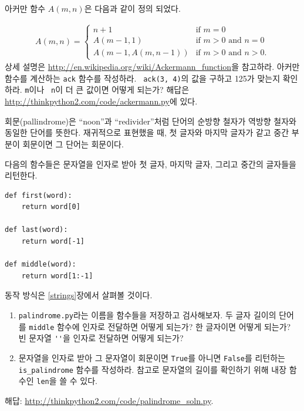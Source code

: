\documentclass[10pt]{book}
\begin{document}
\begin{exercise}
\label{ackermann}

아커만 함수 $A(m, n)$은 다음과 같이 정의 되었다. 

\begin{eqnarray*}
A(m, n) = \begin{cases} 
              n+1 & \mbox{if } m = 0 \\ 
        A(m-1, 1) & \mbox{if } m > 0 \mbox{ and } n = 0 \\ 
A(m-1, A(m, n-1)) & \mbox{if } m > 0 \mbox{ and } n > 0.
\end{cases} 
\end{eqnarray*}
%
상세 설명은 \url{http://en.wikipedia.org/wiki/Ackermann_function}을
참고하라.  아커만 함수를 계산하는 {\tt ack} 함수를 작성하라.  {\tt
  ack(3, 4)}의 값을 구하고 125가 맞는지 확인하라.  {\tt m}이나 {\tt
  n}이 더 큰 값이면 어떻게 되는가? 해답은
\url{http://thinkpython2.com/code/ackermann.py}에 있다.

\end{exercise}


\begin{exercise}
\label{palindrome}
회문(pallindrome)은 ``noon''과 ``redivider''처럼 단어의 순방향 철자가
역방향 철자와 동일한 단어를 뜻한다.  재귀적으로 표현했을 때, 첫 글자와
마지막 글자가 같고 중간 부분이 회문이면 그 단어는 회문이다.

다음의 함수들은 문자열을 인자로 받아 첫 글자, 마지막 글자, 그리고
중간의 글자들을 리턴한다.

\begin{verbatim}
def first(word):
    return word[0]

def last(word):
    return word[-1]

def middle(word):
    return word[1:-1]
\end{verbatim}
%
동작 방식은 \ref{strings}장에서 살펴볼 것이다. 

\begin{enumerate}

\item {\tt palindrome.py}라는 이름을 함수들을 저장하고 검사해보자.  두
  글자 길이의 단어를 {\tt middle} 함수에 인자로 전달하면 어떻게
  되는가?  한 글자이면 어떻게 되는가? 빈 문자열 \verb"''"을 인자로
  전달하면 어떻게 되는가?

\item 문자열을 인자로 받아 그 문자열이 회문이면 {\tt True}를 아니면
  {\tt False}를 리턴하는 \verb"is_palindrome" 함수를 작성하라.  참고로
  문자열의 길이를 확인하기 위해 내장 함수인 {\tt len}을 쓸 수 있다.

\end{enumerate}

해답: \url{http://thinkpython2.com/code/palindrome_soln.py}.

\end{exercise}
\end{document}
